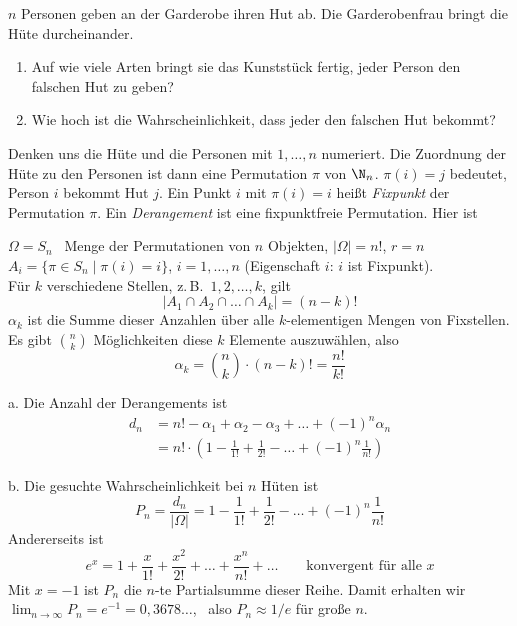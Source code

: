 \begin{beispiel}
$n$ Personen geben an der Garderobe ihren Hut ab. Die Garderobenfrau bringt die Hüte durcheinander.
\begin{enumerate}[label=\alph*.]
\item Auf wie viele Arten bringt sie das Kunststück fertig, jeder Person den falschen Hut zu geben?
\item Wie hoch ist die Wahrscheinlichkeit, dass jeder den falschen Hut bekommt?
\end{enumerate}

Denken uns die Hüte und die Personen mit $1, \dots, n$ numeriert. Die Zuordnung der Hüte zu den Personen ist dann eine Permutation $\pi$ von $\N_n$.
$\pi(i) = j$ bedeutet, Person $i$ bekommt Hut $j$.
Ein Punkt $i$ mit $\pi(i) = i$ heißt \emph{Fixpunkt} der Permutation $\pi$. Ein \emph{Derangement} ist eine fixpunktfreie Permutation. Hier ist

$\Omega = S_n$ \ Menge der Permutationen von $n$ Objekten, \quad $|\Omega| = n!$, \quad $r = n$\\
$A_i = \{ \pi \in S_n \mid \pi(i) = i \}$, \quad $i = 1, \dots, n$ \quad (Eigenschaft $i$: $i$ ist Fixpunkt).\\
Für $k$ verschiedene Stellen, z.\,B.\ $1, 2, \dots, k$, gilt
\[
|A_1 \cap A_2 \cap \dots \cap A_k| = (n-k)!
\]
$\alpha_k$ ist die Summe dieser Anzahlen über alle $k$-elementigen Mengen von Fixstellen.
Es gibt $\binom{n}{k}$ Möglichkeiten diese $k$ Elemente auszuwählen, also
\[
\alpha_k = \binom{n}{k}\cdot(n-k)! = \frac{n!}{k!}
\]

a. Die Anzahl der Derangements ist
\begin{align*}
d_n &= n! - \alpha_1 + \alpha_2 - \alpha_3 + \dots + (-1)^n \alpha_n \\
&= n! \cdot \left(1 - \frac{1}{1!} + \frac{1}{2!} - \dots + (-1)^n\frac{1}{n!}\right)
\end{align*}

b. Die gesuchte Wahrscheinlichkeit bei $n$ Hüten ist
\[
P_n = \frac{d_n}{|\Omega|} = 1 - \frac{1}{1!} + \frac{1}{2!} - \dots + (-1)^n\frac{1}{n!}
\]
Andererseits ist
\[
e^x = 1 + \frac{x}{1!} + \frac{x^2}{2!} + \dots + \frac{x^n}{n!} + \dots \qquad \text{konvergent für alle } x
\]
Mit $x = -1$ ist $P_n$ die $n$-te Partialsumme dieser Reihe. Damit erhalten wir \quad $\lim_{n \to \infty} P_n = e^{-1} = 0{,}3678\ldots$, \ also $P_n \approx 1/e$ für große $n$.
\end{beispiel}

